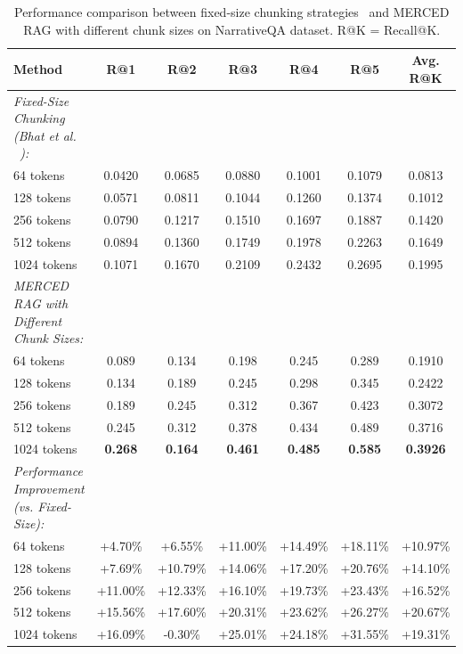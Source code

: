 \documentclass[10pt,twocolumn,letterpaper]{article}
\begin{document}
\begin{table}[!ht]
\caption{Performance comparison between fixed-size chunking strategies~\cite{Bhat2025Rethinking} and MERCED RAG with different chunk sizes on NarrativeQA dataset. R@K = Recall@K.}
\centering
\begin{tabular}{lcccccc}
\toprule
\textbf{Method} & \textbf{R@1} & \textbf{R@2} & \textbf{R@3} & \textbf{R@4} & \textbf{R@5} & \textbf{Avg. R@K} \\
\midrule
\multicolumn{1}{l}{\textit{Fixed-Size Chunking (Bhat et al. ~\cite{Bhat2025Rethinking}):}} \\
64 tokens & 0.0420 & 0.0685 & 0.0880 & 0.1001 & 0.1079 & 0.0813 \\
128 tokens & 0.0571 & 0.0811 & 0.1044 & 0.1260 & 0.1374 & 0.1012 \\
256 tokens & 0.0790 & 0.1217 & 0.1510 & 0.1697 & 0.1887 & 0.1420 \\
512 tokens & 0.0894 & 0.1360 & 0.1749 & 0.1978 & 0.2263 & 0.1649 \\
1024 tokens & 0.1071 & 0.1670 & 0.2109 & 0.2432 & 0.2695 & 0.1995 \\
\midrule
\multicolumn{1}{l}{\textit{MERCED RAG with Different Chunk Sizes:}} \\
64 tokens & 0.089 & 0.134 & 0.198 & 0.245 & 0.289 & 0.1910 \\
128 tokens & 0.134 & 0.189 & 0.245 & 0.298 & 0.345 & 0.2422 \\
256 tokens & 0.189 & 0.245 & 0.312 & 0.367 & 0.423 & 0.3072 \\
512 tokens & 0.245 & 0.312 & 0.378 & 0.434 & 0.489 & 0.3716 \\
1024 tokens & \textbf{0.268} & \textbf{0.164} & \textbf{0.461} & \textbf{0.485} & \textbf{0.585} & \textbf{0.3926} \\
\midrule
\multicolumn{1}{l}{\textit{Performance Improvement (vs. Fixed-Size):}} \\
64 tokens & +4.70\% & +6.55\% & +11.00\% & +14.49\% & +18.11\% & +10.97\% \\
128 tokens & +7.69\% & +10.79\% & +14.06\% & +17.20\% & +20.76\% & +14.10\% \\
256 tokens & +11.00\% & +12.33\% & +16.10\% & +19.73\% & +23.43\% & +16.52\% \\
512 tokens & +15.56\% & +17.60\% & +20.31\% & +23.62\% & +26.27\% & +20.67\% \\
1024 tokens & +16.09\% & -0.30\% & +25.01\% & +24.18\% & +31.55\% & +19.31\% \\
\bottomrule
\end{tabular}
\label{tab:chunking_comparison_extended}
\end{table}
\end{document}
